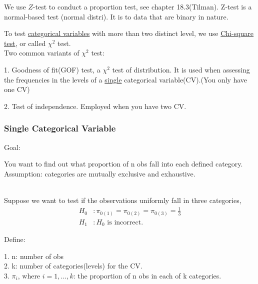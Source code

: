 \documentclass[12pt]{article}
\begin{document}
We use $ Z $-test to conduct a proportion test,
see chapter 18.3(Tilman). Z-test is a normal-based test (normal distri).
It is to data that are binary in nature.

To test {\underline {categorical variables}} with more than two
distinct level, we use {\underline {Chi-square test}}, or called
$ \chi^{2} $ test.\\


Two common variants of $ \chi^{2} $ test: 

1. Goodness of fit(GOF) test, a $ \chi^{2} $ test of distribution.
It is used when assessing the frequencies in the levels of a 
{\underline {single}} categorical variable(CV).(You only have one CV)


2. Test of independence. Employed when you have two CV.




\subsubsection{Single Categorical Variable}
Goal:

You want to find out what proportion of n obs fall into each defined
category.\\

Assumption: categories are mutually exclusive and exhaustive.

\noindent{}\\


Suppose we want to test if the observations uniformly fall in three
categories, 
\begin{align*}
		H_0&: \pi_{0(1)} = \pi_{0(2)} = \pi_{0(3)} = \frac{1}{3}\\
		H_1&: H_0 \text{ is incorrect. }
\end{align*}





Define:

1. n: number of obs\\
2. k: number of categories(levels) for the CV.\\
3. $ \pi_{i}$, where $ i = 1, ..., k $: the proportion of n obs in each
of k categories.\\
\noindent{}\\
\end{document}
